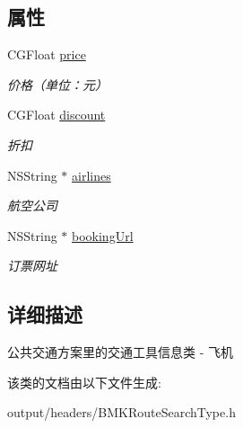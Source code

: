 \subsection*{属性}
\begin{DoxyCompactItemize}
\item 
\hypertarget{interface_b_m_k_plane_vehicle_info_aeab65e97aaa900da1dc94ed0c5a5b6a6}{}C\+G\+Float \hyperlink{interface_b_m_k_plane_vehicle_info_aeab65e97aaa900da1dc94ed0c5a5b6a6}{price}\label{interface_b_m_k_plane_vehicle_info_aeab65e97aaa900da1dc94ed0c5a5b6a6}

\begin{DoxyCompactList}\small\item\em 价格（单位：元） \end{DoxyCompactList}\item 
\hypertarget{interface_b_m_k_plane_vehicle_info_a50cc7db161ea732bf5c9fcad5fe552b9}{}C\+G\+Float \hyperlink{interface_b_m_k_plane_vehicle_info_a50cc7db161ea732bf5c9fcad5fe552b9}{discount}\label{interface_b_m_k_plane_vehicle_info_a50cc7db161ea732bf5c9fcad5fe552b9}

\begin{DoxyCompactList}\small\item\em 折扣 \end{DoxyCompactList}\item 
\hypertarget{interface_b_m_k_plane_vehicle_info_ac47b235b81c00c8ba3e5458ab59d5f09}{}N\+S\+String $\ast$ \hyperlink{interface_b_m_k_plane_vehicle_info_ac47b235b81c00c8ba3e5458ab59d5f09}{airlines}\label{interface_b_m_k_plane_vehicle_info_ac47b235b81c00c8ba3e5458ab59d5f09}

\begin{DoxyCompactList}\small\item\em 航空公司 \end{DoxyCompactList}\item 
\hypertarget{interface_b_m_k_plane_vehicle_info_a6cccb2867c9b47825a1fc5949dbfffa2}{}N\+S\+String $\ast$ \hyperlink{interface_b_m_k_plane_vehicle_info_a6cccb2867c9b47825a1fc5949dbfffa2}{booking\+Url}\label{interface_b_m_k_plane_vehicle_info_a6cccb2867c9b47825a1fc5949dbfffa2}

\begin{DoxyCompactList}\small\item\em 订票网址 \end{DoxyCompactList}\end{DoxyCompactItemize}


\subsection{详细描述}
公共交通方案里的交通工具信息类 -\/ 飞机 

该类的文档由以下文件生成\+:\begin{DoxyCompactItemize}
\item 
output/headers/B\+M\+K\+Route\+Search\+Type.\+h\end{DoxyCompactItemize}
